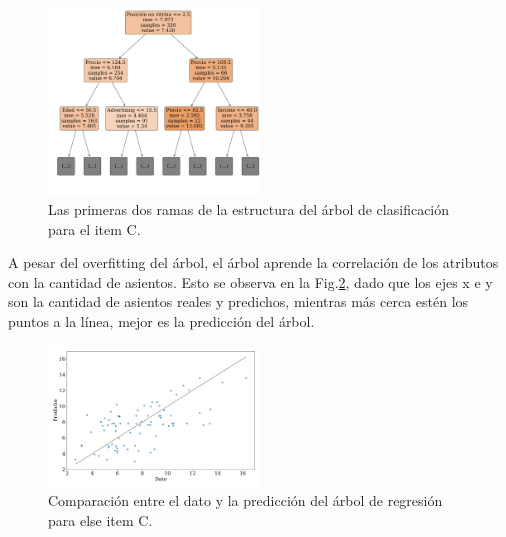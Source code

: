 \begin{figure}[H]
    \begin{small}
        \begin{center}
            \includegraphics[width=0.5\textwidth]{figures/tree_C_tree.pdf}
        \end{center}
        \caption{Las primeras dos ramas de la estructura del árbol de clasificación para el item C.}
        \label{fig:item_C_tree}
    \end{small}
\end{figure}

A pesar del overfitting del árbol, el árbol aprende la correlación de los atributos con la cantidad de asientos. Esto se observa en la Fig.\ref{fig:item_C_scatter}, dado que los ejes x e y son la cantidad de asientos reales y predichos, mientras más cerca estén los puntos a la línea, mejor es la predicción del árbol.
\begin{figure}[H]
    \begin{small}
        \begin{center}
            \includegraphics[width=0.5\textwidth]{figures/fit_C_tree.pdf}
        \end{center}
        \caption{Comparación entre el dato y la predicción del árbol de regresión para else item C.}
        \label{fig:item_C_scatter}
    \end{small}
\end{figure}

